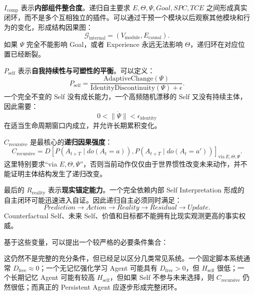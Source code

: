 $I_{\mathrm{comp}}$ 表示\textbf{内部组件整合度}。递归自主要求 $E,\Theta,\Psi,Goal,SPC,TCE$ 之间形成真实闭环，而不是多个互相独立的插件。可以通过干预一个模块以后观察其他模块和行为的变化，形成结构因果图：
\[
\mathcal G_{\mathrm{internal}}
=
(V_{\mathrm{module}},E_{\mathrm{causal}}).
\]
如果 $\Psi$ 完全不能影响 Goal，或者 Experience 永远无法影响 $\Theta$，递归环在对应位置已经断裂。

$P_{\mathrm{self}}$ 表示\textbf{自我持续性与可塑性的平衡}。可以定义：
\[
P_{\mathrm{self}}
=
\frac{
\mathrm{AdaptiveChange}(\Psi)
}{
\mathrm{IdentityDiscontinuity}(\Psi)+\epsilon
}.
\]
一个完全不变的 Self 没有成长能力，一个高频随机漂移的 Self 又没有持续主体，因此需要：
\[
0<
\|\dot\Psi\|
<
\epsilon_{\mathrm{identity}}
\]
在适当生命周期窗口内成立，并允许长期累积变化。

$C_{\mathrm{recursive}}$ 是最核心的\textbf{递归因果强度}：
\[
C_{\mathrm{recursive}}
=
D
\left[
P(A_{t+T}\mid do(A_t=a)),
P(A_{t+T}\mid do(A_t=a'))
\right]_{\mathrm{via}\ E,\Theta,\Psi}.
\]
这里特别要求“via $E,\Theta,\Psi$”，否则当前动作仅仅由于世界惯性改变未来动作，并不能证明主体结构发生了递归改变。

最后的 $R_{\mathrm{reality}}$ 表示\textbf{现实锚定能力}。一个完全依赖内部 Self Interpretation 形成的自主闭环可能迅速进入自证。因此递归自主必须同时满足：
\[
Prediction
\rightarrow
Action
\rightarrow
Reality
\rightarrow
Residual
\rightarrow
Update.
\]
Counterfactual Self、未来 Self、价值和目标都不能拥有比现实观测更高的事实权威。

基于这些变量，可以提出一个较严格的必要条件集合：
\begin{statementbox}
\centering
{}
\end{statementbox}
这仍然不是完整的充分条件，但已经足以区分几类常见系统。一个固定脚本系统通常 $D_{\mathrm{free}}\approx0$；一个无记忆强化学习 Agent 可能具有 $D_{\mathrm{free}}>0$，但 $H_{\mathrm{self}}$ 很低；一个长期记忆 Agent 可能有较高 $H_{\mathrm{self}}$，但如果 Self 不参与未来选择，则 $C_{\mathrm{recursive}}$ 仍然很低；而真正的 Persistent Agent 应逐步形成完整闭环。

